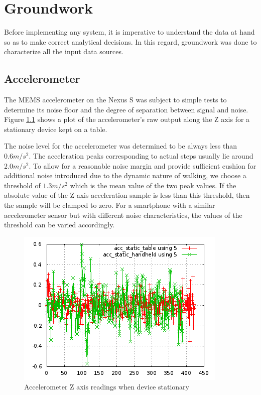 \chapter{Groundwork\label{chap:groundwork}}


Before implementing any system, it is imperative to understand the data at hand
so as to make correct analytical decisions. In this regard, groundwork was done
to characterize all the input data sources.

\section{Accelerometer}

The MEMS accelerometer on the Nexus S was subject to simple tests to determine 
its noise floor and the degree of separation between signal and noise.
Figure \ref{fig:accel_static} shows a plot of the accelerometer's raw output 
along the Z axis for a stationary device kept on a table. 

The noise level for the accelerometer was determined to be always less
than $0.6 m/s^2$. The acceleration peaks corresponding to actual steps usually
lie around $2.0 m/s^2$. To allow for a reasonable noise margin and provide
sufficient cushion for additional noise introduced due to the dynamic nature of
walking, we choose a threshold of $1.3 m/s^2$ which is the mean value of the two
peak values. If the absolute value of the Z-axis acceleration sample is less
than this threshold, then the sample will be clamped to zero. For a smartphone
with a similar accelerometer sensor but with different noise characteristics,
the values of the threshold can be varied accordingly. 


\begin{figure}\centering
    \includegraphics{figures/accel_static.png}
    \caption{Accelerometer Z axis readings when device stationary\label{fig:accel_static}}
\end{figure}


